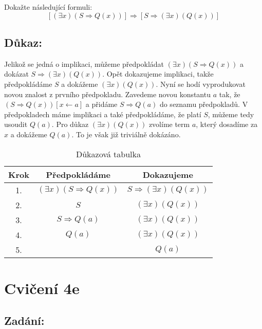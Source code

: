 \documentclass{article}
\begin{document}
Dokažte následující formuli:
$$[(\exists x)(S \Rightarrow Q(x))] \Rightarrow [S \Rightarrow (\exists x)(Q(x))]$$

\subsection{Důkaz:}
Jelikož se jedná o implikaci, můžeme předpokládat $(\exists x)(S \Rightarrow Q(x))$ a dokázat $S \Rightarrow (\exists x)(Q(x))$. Opět dokazujeme implikaci, takže předpokládáme $S$ a dokážeme $(\exists x)(Q(x))$. Nyní se hodí vyprodukovat novou znalost z prvního předpokladu. Zavedeme novou konstantu $a$ tak, že $(S \Rightarrow Q(x))[x \leftarrow a]$ a přidáme $S \Rightarrow Q(a)$ do seznamu předpokladů. V předpokladech máme implikaci a také předpokládáme, že platí $S$, můžeme tedy usoudit $Q(a)$. Pro důkaz $(\exists x)(Q(x))$ zvolíme term $a$, který dosadíme za $x$ a dokážeme $Q(a)$. To je však již triviálně dokázáno.

\begin{table}[H]\centering

    \caption{Důkazová tabulka}

\begin{tabular}{|c|c|c|}
    
    
        \hline \textbf{Krok} & \textbf{Předpokládáme} & \textbf{Dokazujeme} \\ \hline \hline
    	1. & $(\exists x)(S \Rightarrow Q(x))$ & $S \Rightarrow (\exists x)(Q(x))$ \\ \hline
    	2. & $S$ & $(\exists x)(Q(x))$ \\ \hline
        3. & $S \Rightarrow Q(a)$ & $(\exists x)(Q(x))$ \\ \hline
    	4. & $Q(a)$ & $(\exists x)(Q(x))$ \\ \hline
    	5. & & $Q(a)$ \\ \hline
    	
    	\end{tabular}
\end{table}

\section{Cvičení 4e}

\subsection{Zadání:}
\end{document}

